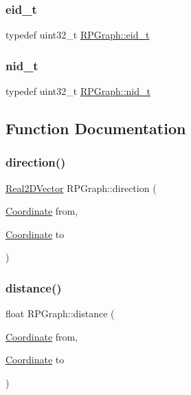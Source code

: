 \subsubsection{\texorpdfstring{eid\+\_\+t}{eid\_t}}
{\footnotesize\ttfamily typedef uint32\+\_\+t \mbox{\hyperlink{namespaceRPGraph_ae1c8374fd31c97d09000581a63811ee4}{R\+P\+Graph\+::eid\+\_\+t}}}

\mbox{\label{namespaceRPGraph_ab3ae34f1ab88e48f43794c30c8697b74}} 
\subsubsection{\texorpdfstring{nid\+\_\+t}{nid\_t}}
{\footnotesize\ttfamily typedef uint32\+\_\+t \mbox{\hyperlink{namespaceRPGraph_ab3ae34f1ab88e48f43794c30c8697b74}{R\+P\+Graph\+::nid\+\_\+t}}}



\subsection{Function Documentation}
\mbox{\label{namespaceRPGraph_a18f01f18cedd3449b2bface612bde934}} 
\subsubsection{\texorpdfstring{direction()}{direction()}}
{\footnotesize\ttfamily \mbox{\hyperlink{classRPGraph_1_1Real2DVector}{Real2\+D\+Vector}} R\+P\+Graph\+::direction (\begin{DoxyParamCaption}\item[{\mbox{\hyperlink{classRPGraph_1_1Coordinate}{Coordinate}}}]{from,  }\item[{\mbox{\hyperlink{classRPGraph_1_1Coordinate}{Coordinate}}}]{to }\end{DoxyParamCaption})}

\mbox{\label{namespaceRPGraph_ac0ea5eed59279f669d6a944798a58d48}} 
\subsubsection{\texorpdfstring{distance()}{distance()}}
{\footnotesize\ttfamily float R\+P\+Graph\+::distance (\begin{DoxyParamCaption}\item[{\mbox{\hyperlink{classRPGraph_1_1Coordinate}{Coordinate}}}]{from,  }\item[{\mbox{\hyperlink{classRPGraph_1_1Coordinate}{Coordinate}}}]{to }\end{DoxyParamCaption})}

